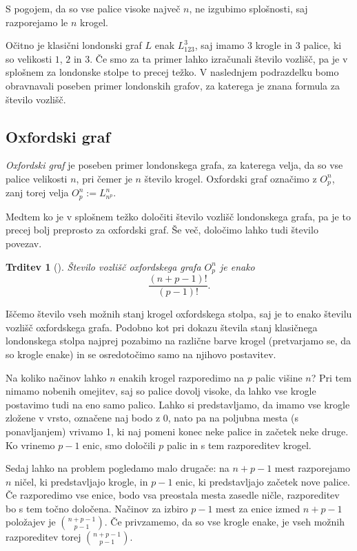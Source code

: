 \documentclass[12pt,a4paper]{amsart}
\theoremstyle{definition} %
\theoremstyle{plain} %
\newtheorem{trditev}[definicija]{Trditev}
\begin{document}
S pogojem, da so vse palice visoke največ $n$, ne izgubimo splošnosti, saj razporejamo le $n$ krogel.

Očitno je klasični londonski graf $L$ enak $L_{123}^3$, saj imamo $3$ krogle in $3$ palice, ki so velikosti $1$, $2$ in $3$.
Če smo za ta primer lahko izračunali število vozlišč, pa je v splošnem za londonske stolpe to precej težko. V naslednjem podrazdelku bomo obravnavali poseben primer londonskih grafov, za katerega je znana formula za število vozlišč. 

\subsection{Oxfordski graf}

\emph{Oxfordski graf} je poseben primer londonskega grafa, za katerega velja, da so vse palice velikosti $n$, pri čemer je $n$ število krogel. Oxfordski graf označimo z $O^n_p$, zanj torej velja $O^n_p := L^n_{n^p}$.

Medtem ko je v splošnem težko določiti število vozlišč londonskega grafa, pa je to precej bolj preprosto za oxfordski graf. Še več, določimo lahko tudi število povezav.

\begin{trditev}[{\cite[Exercise~7.3.]{bib:tohmyths}}]
    Število vozlišč oxfordskega grafa $O^n_p$ je enako 
    \begin{equation}
        \label{eq:oxford-vozl}
        \frac{(n+p-1)!}{(p-1)!}.
    \end{equation}

\end{trditev}

\proof
    Iščemo število vseh možnih stanj krogel oxfordskega stolpa, saj je to enako številu vozlišč oxfordskega grafa.
    Podobno kot pri dokazu števila stanj klasičnega londonskega stolpa najprej pozabimo na različne barve krogel (pretvarjamo se, da so krogle enake) in se osredotočimo samo na njihovo postavitev. 
    
    Na koliko načinov lahko $n$ enakih krogel razporedimo na $p$ palic višine $n$? Pri tem nimamo nobenih omejitev, saj so palice dovolj visoke, da lahko vse krogle postavimo tudi na eno samo palico. Lahko si predstavljamo, da imamo vse krogle zložene v vrsto, označene naj bodo z 0, nato pa na poljubna mesta (s ponavljanjem) vrivamo 1, ki naj pomeni konec neke palice in začetek neke druge. Ko vrinemo $p-1$ enic, smo določili $p$ palic in s tem razporeditev krogel. 
    
    Sedaj lahko na problem pogledamo malo drugače: na $n+p-1$ mest razporejamo $n$ ničel, ki predstavljajo krogle, in $p-1$ enic, ki predstavljajo začetek nove palice. Če razporedimo vse enice, bodo vsa preostala mesta zasedle ničle, razporeditev bo s tem točno določena. Načinov za izbiro $p-1$ mest za enice izmed $n+p-1$ položajev je ${n+p-1 \choose p-1}$. Če privzamemo, da so vse krogle enake, je vseh možnih razporeditev torej ${n+p-1 \choose p-1}$.
    
\end{document}

